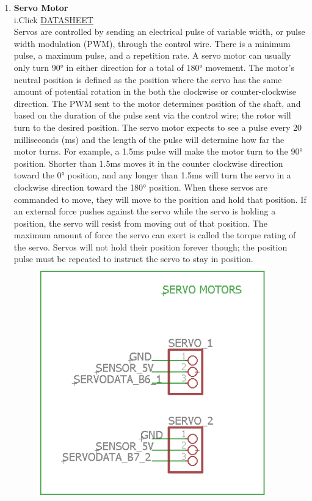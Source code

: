 \documentclass[a4paper,12pt,oneside]{book}
\begin{document}
\begin{enumerate}
    \item \textbf{Servo Motor}\\
    i.Click \href{http://www.es.co.th/schemetic/pdf/et-servo-s3003.pdf}{DATASHEET}
    \\[0.5cm]Servos are controlled by sending an electrical pulse of variable width, or pulse width modulation (PWM), through the control wire. There is a minimum pulse, a maximum pulse, and a repetition rate. A servo motor can usually only turn 90° in either direction for a total of 180° movement. The motor's neutral position is defined as the position where the servo has the same amount of potential rotation in the both the clockwise or counter-clockwise direction. The PWM sent to the motor determines position of the shaft, and based on the duration of the pulse sent via the control wire; the rotor will turn to the desired position. The servo motor expects to see a pulse every 20 milliseconds (ms) and the length of the pulse will determine how far the motor turns. For example, a 1.5ms pulse will make the motor turn to the 90° position. Shorter than 1.5ms moves it in the counter clockwise direction toward the 0° position, and any longer than 1.5ms will turn the servo in a clockwise direction toward the 180° position. When these servos are commanded to move, they will move to the position and hold that position. If an external force pushes against the servo while the servo is holding a position, the servo will resist from moving out of that position. The maximum amount of force the servo can exert is called the torque rating of the servo. Servos will not hold their position forever though; the position pulse must be repeated to instruct the servo to stay in position. 
    \\\hfill\includegraphics[width=12cm, height=10cm]{servo}
    

\end{enumerate}
\end{document}
